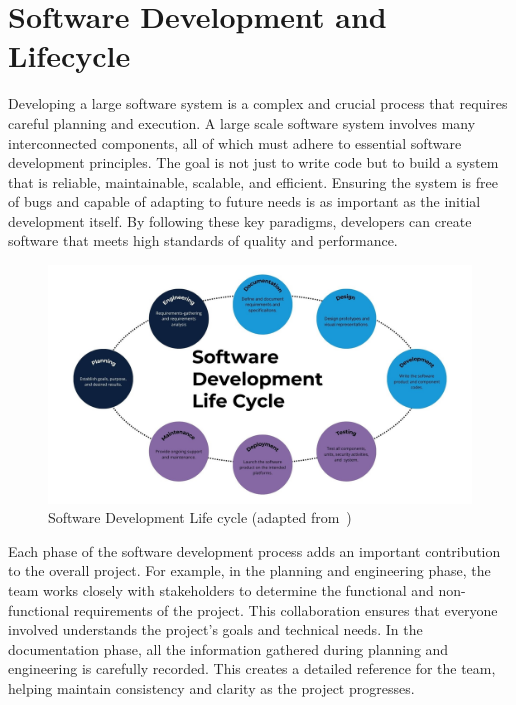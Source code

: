 \section{Software Development and Lifecycle}

Developing a large software system is a complex and crucial process that requires careful planning and execution. A large scale software system involves many interconnected components, all of which must adhere to essential software development principles. The goal is not just to write code but to build a system that is reliable, maintainable, scalable, and efficient. Ensuring the system is free of bugs and capable of adapting to future needs is as important as the initial development itself. By following these key paradigms, developers can create software that meets high standards of quality and performance.

\begin{figure}[H]
    \centering
    \includegraphics[width=1\textwidth]{figures/software_development.png}
    \caption{Software Development Life cycle (adapted from~\citep{sire_sdlc_2024})}
	\label{fig_background_sd}
\end{figure}

Each phase of the software development process adds an important contribution to the overall project. For example, in the planning and engineering phase, the team works closely with stakeholders to determine the functional and non-functional requirements of the project. This collaboration ensures that everyone involved understands the project's goals and technical needs. In the documentation phase, all the information gathered during planning and engineering is carefully recorded. This creates a detailed reference for the team, helping maintain consistency and clarity as the project progresses.

